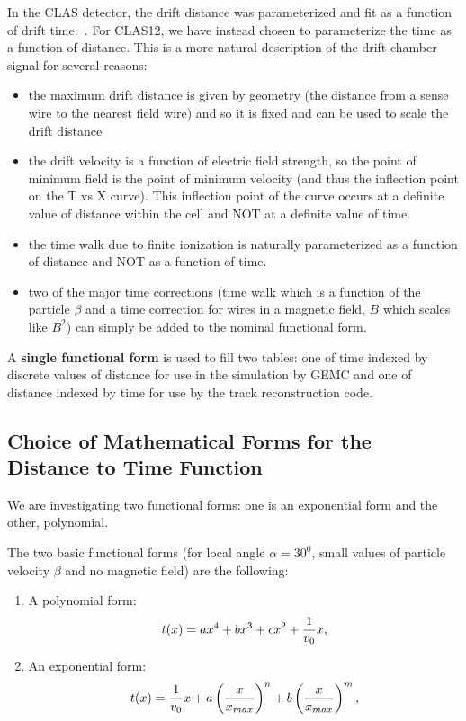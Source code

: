 \documentclass{article}
\begin{document}
In the CLAS detector, the drift distance was parameterized and fit as a function
of drift time.~\cite{mdm95}.
For CLAS12, we have instead chosen to parameterize the time as a function of
distance.  This is a more natural description of the drift chamber signal
for several reasons:
\begin{itemize}
\item the maximum drift distance is given by geometry (the distance from
a sense wire to the nearest field wire) and so it is fixed and can be used
to scale the drift distance
\item the drift velocity is a function of electric field strength, so the
point of minimum field is the point of minimum velocity (and thus the inflection point on the T vs X curve). 
This inflection point of the curve occurs at a
definite value of distance within the cell and NOT at a definite value of time.
\item the time walk due to finite ionization is
naturally parameterized as a function of distance and NOT as a function of time.
\item two of the major time corrections (time walk which is a function of the
particle $\beta$ and a time correction for wires in a magnetic field, $B$ which
scales like $B^2$) can simply be added to the nominal functional form.
\end{itemize}

A {\bf single functional form} is used to fill two tables: one of time indexed by discrete
values of distance for use in the simulation by GEMC and one of 
distance indexed by time for use by the track reconstruction code.


\subsection{Choice of Mathematical Forms for the Distance to Time Function}
We are investigating two functional forms: one is an exponential form and the other, polynomial.

The two basic functional forms (for local angle $\alpha = 30^0$, small values
of particle velocity $\beta$ and no magnetic field) are the following:
\begin{enumerate}
\item A polynomial form:
\begin{equation}
t(x) =  a x^4 + b x^3 + c x^2 + {1 \over v_0} x,
\end{equation}
\item An exponential form:
\begin{equation}
t(x) = {1 \over v_0} x + a \left( {x \over x_{max}} \right)^n
+ b \left( { x \over x_{max}} \right)^m,
\end{equation}
\end{enumerate}
\end{document}
